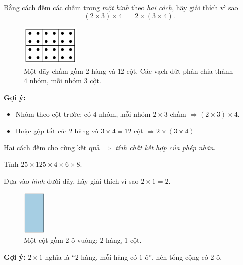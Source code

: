 \begin{problem}[1.8]
Bằng cách đếm các chấm trong \emph{một hình} theo \emph{hai cách}, hãy giải thích vì sao
\[
(2\times3)\times4 \;=\; 2\times(3\times4).
\]

\begin{figure}[ht!]
  \centering
  \includegraphics[width=0.25\textwidth]{img/fig-prob1.8.pdf}
  \caption*{\small Một dãy chấm gồm \(2\) hàng và \(12\) cột. Các vạch đứt
  phân chia thành \(4\) nhóm, mỗi nhóm \(3\) cột.}
\end{figure}

\textbf{Gợi ý:} 
\begin{itemize}
  \item Nhóm theo cột trước: có \(4\) nhóm, mỗi nhóm \(2\times3\) chấm
  \(\Rightarrow (2\times3)\times4\).
  \item Hoặc gộp tất cả: \(2\) hàng và \(3\times4=12\) cột
  \(\Rightarrow 2\times(3\times4)\).
\end{itemize}
Hai cách đếm cho cùng kết quả \(\Rightarrow\) \emph{tính chất kết hợp của phép nhân}.
\end{problem}

\begin{problem}[1.9]
Tính \(25\times125\times4\times6\times8\).
\end{problem}

\begin{problem}[1.10]
Dựa vào \emph{hình} dưới đây, hãy giải thích vì sao \(2\times1=2\).

\begin{figure}[ht!]
  \centering
  \includegraphics[width=0.10\textwidth]{img/fig-prob1.10.pdf}
  \caption*{\small Một cột gồm \(2\) ô vuông: \(2\) hàng, \(1\) cột.}
\end{figure}

\textbf{Gợi ý:} \(2\times1\) nghĩa là “\(2\) hàng, mỗi hàng có \(1\) ô”,
nên tổng cộng có \(2\) ô.
\end{problem}

